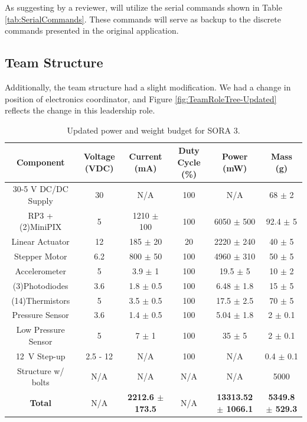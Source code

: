 As suggesting by a reviewer, will utilize the serial commands shown in Table \ref{tab:SerialCommands}. These commands will serve as backup to the discrete commands presented in the original application.

\subsection{Team Structure}

Additionally, the team structure had a slight modification.
We had a change in position of electronics coordinator, and Figure \ref{fig:TeamRoleTree-Updated} reflects the change in this leadership role.

\newpage

\begin{table}[H]
  \centering
  \caption{Updated power and weight budget for SORA 3.} 
  \label{tab:PWBudget-Updated}
  \bigskip
  \begin{tabular}{cccccc}
    \hline
    \hline
    \multicolumn{1}{c}{\bfseries Component} & \multicolumn{1}{c}{\bfseries Voltage (\si{\volt}DC)} &  \multicolumn{1}{c}{\bfseries Current (\si{\milli\ampere})} & \multicolumn{1}{c}{\bfseries Duty Cycle (\%)} & \multicolumn{1}{c}{\bfseries Power (\si{\milli\watt})} & \multicolumn{1}{c}{\bfseries Mass (\si{\gram})} \\
    \hline
    30-5 \si{\volt} DC/DC Supply & 30 & N/A & 100 & N/A & 68 $\pm$ 2 \\
    RP3 + (2)MiniPIX & 5 & 1210 $\pm$ 100 & 100 & 6050 $\pm$ 500 & 92.4 $\pm$ 5 \\    
    Linear Actuator & 12 & 185 $\pm$ 20 & 20 & 2220 $\pm$ 240 & 40 $\pm$ 5 \\
    Stepper Motor & 6.2 & 800 $\pm$ 50 & 100 & 4960 $\pm$ 310 & 50 $\pm$ 5 \\
    Accelerometer & 5 & 3.9 $\pm$ 1 & 100 & 19.5 $\pm$ 5 & 10 $\pm$ 2 \\
    (3)Photodiodes & 3.6 & 1.8 $\pm$ 0.5 & 100 & 6.48 $\pm$ 1.8 & 15 $\pm$ 5 \\
    (14)Thermistors & 5 & 3.5 $\pm$ 0.5 & 100 & 17.5 $\pm$ 2.5 & 70 $\pm$ 5 \\
    Pressure Sensor & 3.6 & 1.4 $\pm$ 0.5 & 100 & 5.04 $\pm$ 1.8 & 2 $\pm$ 0.1 \\
    Low Pressure Sensor & 5 & 7 $\pm$ 1 & 100 & 35 $\pm$ 5 & 2 $\pm$ 0.1 \\   
    \SI{12}{\volt} Step-up & 2.5 - 12 & N/A & 100 & N/A & 0.4 $\pm$ 0.1 \\

    Structure w/ bolts & N/A & N/A & N/A & N/A & 5000 \\
    \hline
    \textbf{Total} & N/A & \textbf{2212.6 $\pm$ 173.5} & N/A & \textbf{13313.52 $\pm$ 1066.1} & \textbf{5349.8 $\pm$ 529.3}  \\
    \hline
    \hline
  \end{tabular}
  \medskip
\end{table}

